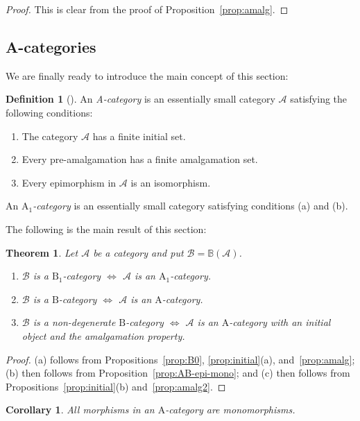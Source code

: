 \documentclass[12pt]{amsart}
\numberwithin{equation}{section}
\newtheorem{theorem}[equation]{Theorem}
\newtheorem{corollary}[equation]{Corollary}
\theoremstyle{definition}
\newtheorem{defnaux}[equation]{Definition}
\newenvironment{definition}[1][]{\begin{defnaux}[#1]\pushQED{\qed}}{\popQED \end{defnaux}}
\newcommand{\cA}{\mathcal{A}}
\newcommand{\rA}{\mathrm{A}}
\newcommand{\cB}{\mathcal{B}}
\newcommand{\rB}{\mathrm{B}}
\newcommand{\defn}[1]{\emph{#1}}
\newcommand{\BB}{\mathbb{B}}
\begin{document}
\begin{proof}
This is clear from the proof of Proposition~\ref{prop:amalg}.
\end{proof}

\subsection{A-categories} \label{ss:Acat}

We are finally ready to introduce the main concept of this section:

\begin{definition} \label{defn:Acat}
An \defn{A-category} is an essentially small category $\cA$ satisfying the following conditions:
\begin{enumerate}
\item The category $\cA$ has a finite initial set.
\item Every pre-amalgamation has a finite amalgamation set.
\item Every epimorphism in $\cA$ is an isomorphism.
\end{enumerate}
An \defn{$\rA_1$-category} is an essentially small category satisfying conditions (a) and (b).
\end{definition}

The following is the main result of this section:

\begin{theorem} \label{thm:AB}
Let $\cA$ be a category and put $\cB=\BB(\cA)$.
\begin{enumerate}
\item $\cB$ is a $\rB_1$-category $\iff$ $\cA$ is an $\rA_1$-category.
\item $\cB$ is a $\rB$-category $\iff$ $\cA$ is an $\rA$-category.
\item $\cB$ is a non-degenerate $\rB$-category $\iff$ $\cA$ is an $\rA$-category with an initial object and the amalgamation property.
\end{enumerate}
\end{theorem}

\begin{proof}
(a) follows from Propositions~\ref{prop:B0}, \ref{prop:initial}(a), and~\ref{prop:amalg}; (b) then follows from Proposition~\ref{prop:AB-epi-mono}; and (c) then follows from Propositions~\ref{prop:initial}(b) and~\ref{prop:amalg2}.
\end{proof}

\begin{corollary} \label{cor:A-mono}
All morphisms in an $\rA$-category are monomorphisms.
\end{corollary}
\end{document}
